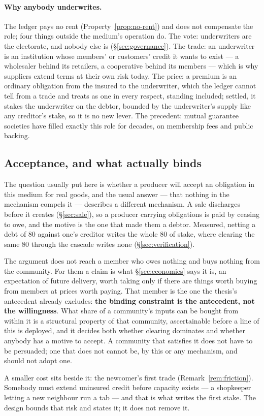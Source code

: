 \paragraph{Why anybody underwrites.} The ledger pays no rent (Property~\ref{prop:no-rent})
and does not compensate the role; four things outside the medium's operation do. The
vote: underwriters are the electorate, and nobody else is (\S\ref{sec:governance}). The
trade: an underwriter is an institution whose members' or customers' credit it wants to
exist --- a wholesaler behind its retailers, a cooperative behind its members --- which is
why suppliers extend terms at their own risk today. The price: a premium is an ordinary
obligation from the insured to the underwriter, which the ledger cannot tell from a trade
and treats as one in every respect, standing included; settled, it stakes the underwriter
on the debtor, bounded by the underwriter's supply like any creditor's stake, so it is no
new lever. The precedent: mutual guarantee societies have filled exactly this role for
decades, on membership fees and public backing.

\subsection{Acceptance, and what actually binds}

The question usually put here is whether a producer will accept an obligation in this
medium for real goods, and the usual answer --- that nothing in the mechanism compels it
--- describes a different mechanism. A sale discharges before it creates
(\S\ref{sec:sale}), so a producer carrying obligations is paid by ceasing to owe, and the
motive is the one that made them a debtor. Measured, netting a debt of $80$ against one's
creditor writes the whole $80$ of stake, where clearing the same $80$ through the cascade
writes none (\S\ref{sec:verification}).

The argument does not reach a member who owes nothing and buys nothing from the community.
For them a claim is what \S\ref{sec:economics} says it is, an expectation of future
delivery, worth taking only if there are things worth buying from members at prices worth
paying. That member is the one the thesis's antecedent already excludes: \textbf{the
binding constraint is the antecedent, not the willingness}. What share of a community's
inputs can be bought from within it is a structural property of that community,
ascertainable before a line of this is deployed, and it decides both whether clearing
dominates and whether anybody has a motive to accept. A community that satisfies it does
not have to be persuaded; one that does not cannot be, by this or any mechanism, and
should not adopt one.

A smaller cost sits beside it: the newcomer's first trade (Remark~\ref{rem:friction}).
Somebody must extend uninsured credit before capacity exists --- a shopkeeper letting a new
neighbour run a tab --- and that is what writes the first stake. The design bounds that
risk and states it; it does not remove it.
